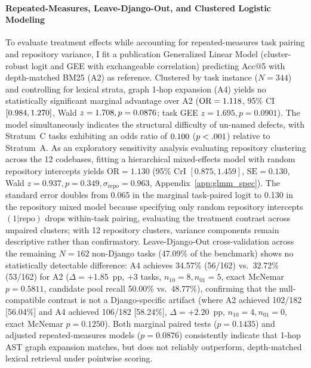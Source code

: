 \documentclass[10pt]{article}
\begin{document}
\paragraph{Repeated-Measures, Leave-Django-Out, and Clustered Logistic Modeling}
To evaluate treatment effects while accounting for repeated-measures task pairing and repository variance, I fit a publication Generalized Linear Model (cluster-robust logit and GEE with exchangeable correlation) predicting Acc@5 with depth-matched BM25 (A2) as reference. Clustered by task instance ($N=344$) and controlling for lexical strata, graph 1-hop expansion (A4) yields no statistically significant marginal advantage over A2 ($\text{OR} = 1.118$, 95\% CI $[0.984, 1.270]$, Wald $z = 1.708, p = 0.0876$; task GEE $z = 1.695, p = 0.0901$). The model simultaneously indicates the structural difficulty of un-named defects, with Stratum~C tasks exhibiting an odds ratio of $0.100$ ($p < .001$) relative to Stratum~A. As an exploratory sensitivity analysis evaluating repository clustering across the 12 codebases, fitting a hierarchical mixed-effects model with random repository intercepts yields $\text{OR} = 1.130$ (95\% CrI $[0.875, 1.459]$, $\text{SE} = 0.130$, Wald $z = 0.937, p = 0.349, \sigma_{\text{repo}} = 0.963$, Appendix~\ref{app:glmm_spec}). The standard error doubles from 0.065 in the marginal task-paired logit to 0.130 in the repository mixed model because specifying only random repository intercepts $(1|\text{repo})$ drops within-task pairing, evaluating the treatment contrast across unpaired clusters; with 12 repository clusters, variance components remain descriptive rather than confirmatory. Leave-Django-Out cross-validation across the remaining $N=162$ non-Django tasks (47.09\% of the benchmark) shows no statistically detectable difference: A4 achieves 34.57\% (56/162) vs.\ 32.72\% (53/162) for A2 ($\Delta = +1.85$~pp, $+3$ tasks, $n_{10}=8, n_{01}=5$, exact McNemar $p=0.5811$, candidate pool recall 50.00\% vs.\ 48.77\%), confirming that the null-compatible contrast is not a Django-specific artifact (where A2 achieved 102/182 [56.04\%] and A4 achieved 106/182 [58.24\%], $\Delta = +2.20$~pp, $n_{10}=4, n_{01}=0$, exact McNemar $p=0.1250$). Both marginal paired tests ($p=0.1435$) and adjusted repeated-measures models ($p=0.0876$) consistently indicate that 1-hop AST graph expansion matches, but does not reliably outperform, depth-matched lexical retrieval under pointwise scoring.
\end{document}
